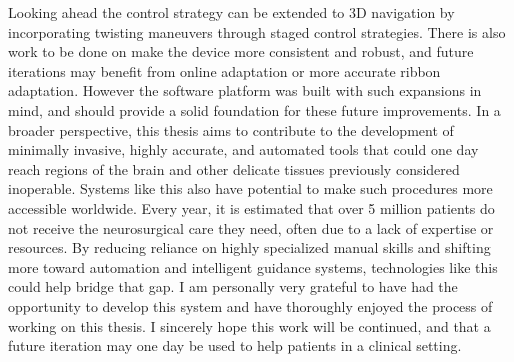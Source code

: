 \newline \newline
Looking ahead the control strategy can be extended to 3D navigation by incorporating twisting maneuvers through staged control strategies. There is also work to be done on make the device more consistent and robust, and future iterations may benefit from online adaptation or more accurate ribbon adaptation. However the software platform was built with such expansions in mind, and should provide a solid foundation for these future improvements.
\newline \newline
In a broader perspective, this thesis aims to contribute to the development of minimally invasive, highly accurate, and automated tools that could one day reach regions of the brain and other delicate tissues previously considered inoperable. Systems like this also have potential to make such procedures more accessible worldwide. Every year, it is estimated that over 5 million patients do not receive the neurosurgical care they need, often due to a lack of expertise or resources. By reducing reliance on highly specialized manual skills and shifting more toward automation and intelligent guidance systems, technologies like this could help bridge that gap. 
\newline \newline
I am personally very grateful to have had the opportunity to develop this system and have thoroughly enjoyed the process of working on this thesis. I sincerely hope this work will be continued, and that a future iteration may one day be used to help patients in a clinical setting.

